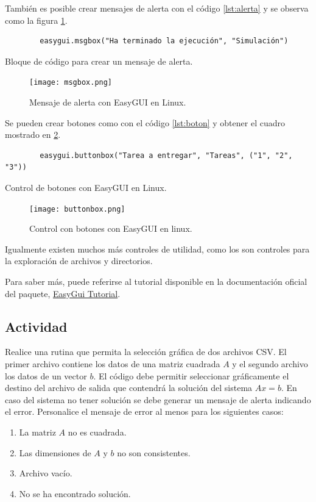 También es posible crear mensajes de alerta con el código \ref{lst:alerta} y se observa como la
figura \ref{fig:msgbox}.

\begin{listing}[H]
    \begin{verbatim}
        easygui.msgbox("Ha terminado la ejecución", "Simulación")
    \end{verbatim}
    \caption{Bloque de código para crear un mensaje de alerta.}
    \label{lst:alerta}
\end{listing}

\begin{figure}
    \centering
    \texttt{[image: msgbox.png]}
    \caption{Mensaje de alerta con EasyGUI en Linux.}
    \label{fig:msgbox}
\end{figure}

Se pueden crear botones como con el código \ref{lst:boton} y obtener el cuadro mostrado en \ref{fig:buttonbox}.

\begin{listing}[H]
    \begin{verbatim}
        easygui.buttonbox("Tarea a entregar", "Tareas", ("1", "2", "3"))
    \end{verbatim}
    \caption{Control de botones con EasyGUI en Linux.}
    \label{lst:boton}
\end{listing}

\begin{figure}
    \centering
    \texttt{[image: buttonbox.png]}
    \caption{Control con botones con EasyGUI en linux.}
    \label{fig:buttonbox}
\end{figure}

Igualmente existen muchos más controles de utilidad, como los son controles para la exploración
de archivos y directorios.

Para saber más, puede referirse al tutorial disponible en la documentación oficial del paquete,
\href{http://easygui.sourceforge.net/tutorial.html}{EasyGui Tutorial}.

\subsection{Actividad}

Realice una rutina que permita la selección gráfica de dos archivos CSV. El primer archivo contiene
los datos de una matriz cuadrada \(A\) y el segundo archivo los datos de un vector \(b\). El código debe permitir
seleccionar gráficamente el destino del archivo de salida que contendrá la solución del sistema \(Ax=b\). En caso
del sistema no tener solución se debe generar un mensaje de alerta indicando el error. Personalice el mensaje de
error al menos para los siguientes casos:

\begin{enumerate}
\item La matriz \(A\) no es cuadrada.
\item Las dimensiones de \(A\) y \(b\) no son consistentes.
\item Archivo vacío.
\item No se ha encontrado solución.
\end{enumerate}

